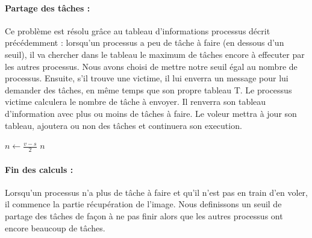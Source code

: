 \documentclass{article}
\begin{document}
\begin{algorithm}[H]



  \caption{Mise \`a jour des informations processus}
\end{algorithm}

\paragraph{Partage des t\^aches : }
Ce probl\`eme est r\'esolu gr\^ace au tableau d'informations processus d\'ecrit pr\'ec\'edemment : 
lorsqu'un processus a peu de t\^ache \`a faire (en dessous d'un seuil), 
il va chercher dans le tableau le maximum de t\^aches encore \`a effecuter par les autres processus. Nous avons choisi de mettre notre seuil égal au nombre de processus.
Ensuite, s'il trouve une victime, il lui enverra un message pour lui demander des t\^aches, en même temps que son propre tableau T.
Le processus victime calculera le nombre de t\^ache \`a envoyer. 
Il renverra son tableau d'information avec plus ou moins de t\^aches \`a faire.
Le voleur mettra \`a jour son tableau, ajoutera ou non des t\^aches et continuera son execution.

\begin{algorithm}[H]

  {
    \;
  }
  {
    $ n \leftarrow \frac{v - s}{2} $ \;
    {
      \;
    }
    {
      \Return $n$\;
    }
  }
  \caption{Calcul du nombre de t\^ache \`a envoyer}
\end{algorithm}

\paragraph{Fin des calculs : }
Lorsqu'un processus n'a plus de t\^ache \`a faire et qu'il n'est pas en train d'en voler, il commence la partie r\'ecup\'eration de l'image.
Nous definissons un seuil de partage des t\^aches de fa\c{c}on \`a ne pas finir alors que les autres processus ont encore beaucoup de t\^aches.
\end{document}
